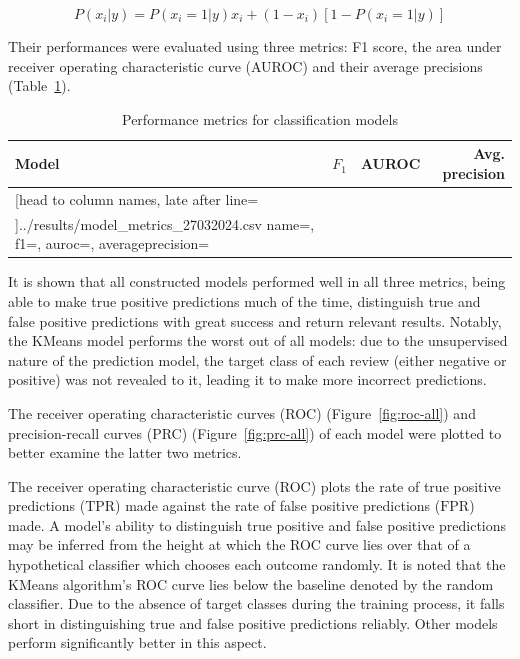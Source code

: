 \documentclass[11pt, a4paper]{pancake-article}
\begin{document}
\begin{equation}
  P\left(x_i|y \right) = P\left(x_i = 1 | y\right)x_i + \left(1 - x_i\right)\left[1 - P\left(x_i=1|y\right)\right]
  \label{eq:nb}
\end{equation}

Their performances were evaluated using three metrics: F1 score, the area under receiver operating characteristic
curve (AUROC) and their average precisions (Table~\ref{tab:metrics}).

\begin{table}
	\centering
	\caption{Performance metrics for classification models}
	\label{tab:metrics}
	\begin{tabular}{lrrr}
		\toprule
		\textbf{Model} & $F_1$ & AUROC & Avg. precision \\
		\midrule
		\csvreader[head to column names, late after line=\\]{../results/model_metrics_27032024.csv}{
			name=\name,
			f1=\fone,
			auroc=\auroc,
			averageprecision=\avgprecision
		}{
		\name          & \fone       & \auroc         & \averageprecision
		}
		\bottomrule
	\end{tabular}
\end{table}

It is shown that all constructed models performed well in all three metrics, being
able to make true positive predictions much of the time, distinguish true and false
positive predictions with great success and return relevant results. Notably, the KMeans
model performs the worst out of all models: due to the unsupervised nature of the prediction
model, the target class of each review (either negative or positive) was not revealed to it,
leading it to make more incorrect predictions.

The receiver operating characteristic curves (ROC) (Figure~\ref{fig:roc-all}) and precision-recall curves (PRC)
(Figure~\ref{fig:prc-all}) of each model were plotted to better examine the latter two metrics.

The receiver operating characteristic curve (ROC) plots the rate of true positive predictions ($\text{TPR}$) made against the
rate of false positive predictions ($\text{FPR}$) made. A model's ability to distinguish
true positive and false positive predictions may be inferred from the height at which the ROC curve
lies over that of a hypothetical classifier which chooses each outcome randomly. It is noted that
the KMeans algorithm's ROC curve lies below the baseline denoted by the random classifier.
Due to the absence of target classes during the training process, it falls short in distinguishing
true and false positive predictions reliably. Other models perform significantly better in this aspect.
\end{document}
